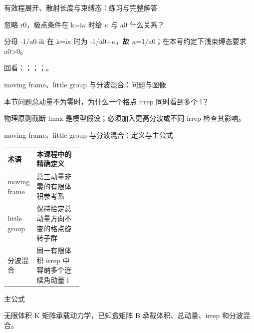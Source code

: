 \begin{frame}[t]{有效程展开、散射长度与束缚态：练习与完整解答}
\footnotesize
\begin{block}{}忽略 r0，极点条件在 k=i\ensuremath{\kappa} 时给 \ensuremath{\kappa} 与 a0 什么关系？\end{block}
\begin{exampleblock}{}分母 -1/\allowbreak{}a0-ik 在 k=i\ensuremath{\kappa} 时为 -1/\allowbreak{}a0+\ensuremath{\kappa}，故 \ensuremath{\kappa}=1/\allowbreak{}a0；在本号约定下浅束缚态要求 a0>0。\end{exampleblock}
\vfill
\scriptsize 回看：；；；。
\end{frame}

\begin{frame}[t]{moving frame、little group 与分波混合：问题与图像}
\footnotesize
\begin{block}{本节问题}总动量不为零时，为什么一个格点 irrep 同时看到多个 l？\end{block}
\begin{block}{物理原则}\quad 截断 lmax 是模型假设；必须加入更高分波或不同 irrep 检查其影响。\end{block}
\end{frame}

\begin{frame}[t]{moving frame、little group 与分波混合：定义与主公式}
\footnotesize\begin{tabularx}{\linewidth}{p{0.30\linewidth}Y}
\toprule 术语 & 本课程中的精确定义\\\midrule
{} moving frame & 总三动量非零的有限体积参考系\\
 little group & 保持给定总动量方向不变的格点旋转子群\\
 分波混合 & 同一有限体积 irrep 中容纳多个连续角动量 l\\
\bottomrule\end{tabularx}\vspace{0.15cm}
\begin{block}{ 主公式}\centering{}\end{block}
无限体积 K 矩阵承载动力学，已知盒矩阵 B 承载体积、总动量、irrep 和分波混合。
\end{frame}

